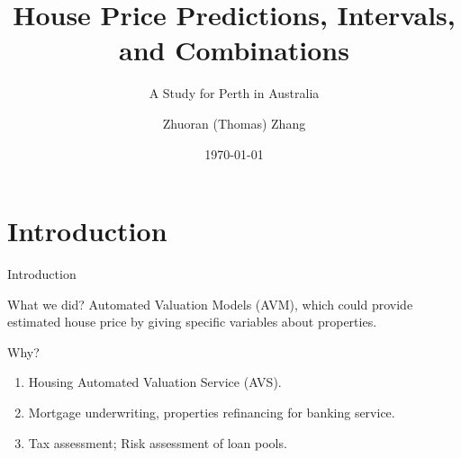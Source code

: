 \documentclass{beamer}
\title{House Price Predictions, Intervals, and Combinations}
\subtitle{A Study for Perth in Australia}
\author{Zhuoran (Thomas) Zhang}
\institute{University of Aberdeen \& Curtin University}
\date{\today}
\begin{document}


\begin{frame}
\titlepage
\end{frame}

\section{Introduction}

\begin{frame}[t]{Introduction}
\begin{block}{What we did?}
\vspace{0.5em}
Automated Valuation Models (AVM), which could provide estimated house price by giving specific variables about properties.
\end{block}

\begin{block}{Why?}
\begin{enumerate}
\item Housing Automated Valuation Service (AVS).
\item Mortgage underwriting, properties refinancing for banking service.
\item Tax assessment; Risk assessment of loan pools.
\end{enumerate}
\end{block}

\end{frame}
\end{document}
